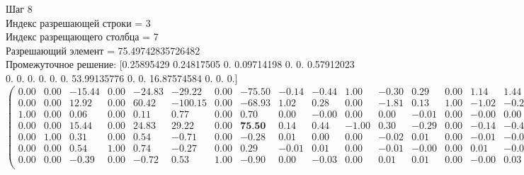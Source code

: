 \documentclass[draft]{article}
\begin{document}
\begin{flushleft}
    Шаг 8 \\
    Индекс разрешающей строки = 3\\
    Индекс разрещающего столбца = 7\\
    Разрешающий элемент = 75.49742835726482\\
    Промежуточное решение:
    [0.25895429  0.24817505  0.  0.09714198  0.  0.  0.57912023  0.  0.  0.  0.  0.  0.  53.99135776  0.  0.  16.87574584  0.  0.  0.]
\begin{equation*}
\begin{pmatrix}
    0.00 & 0.00 & -15.44 & 0.00 & -24.83 &  -29.22 & 0.00 & -75.50 & -0.14 & -0.44 &  1.00 & -0.30 &  0.29 & 0.00 &  1.14 &  1.44 & 0.00 &  1.30 &  0.71 &  1.00 & -16.88 \\
    0.00 & 0.00 &  12.92 & 0.00 &  60.42 & -100.15 & 0.00 & -68.93 &  1.02 &  0.28 &  0.00 & -1.81 &  0.13 & 1.00 & -1.02 & -0.28 & 0.00 &  1.81 & -0.13 & -1.00 &  53.99 \\
    1.00 & 0.00 &   0.06 & 0.00 &   0.11 &    0.77 & 0.00 &   0.70 &  0.00 & -0.00 &  0.00 &  0.00 & -0.01 & 0.00 & -0.00 &  0.00 & 0.00 & -0.00 &  0.01 &  0.00 &   0.26 \\
    0.00 & 0.00 &  15.44 & 0.00 &  24.83 &   29.22 & 0.00 &  \textbf{75.50} &  0.14 &  0.44 & -1.00 &  0.30 & -0.29 & 0.00 & -0.14 & -0.44 & 1.00 & -0.30 &  0.29 &  0.00 &  16.88 \\
    0.00 & 1.00 &   0.31 & 0.00 &   0.54 &   -0.71 & 0.00 &  -0.28 &  0.01 &  0.00 &  0.00 & -0.02 &  0.01 & 0.00 & -0.01 & -0.00 & 0.00 &  0.02 & -0.01 &  0.00 &   0.25 \\
    0.00 & 0.00 &   0.54 & 1.00 &   0.74 &   -0.27 & 0.00 &   0.29 & -0.01 &  0.01 &  0.00 & -0.01 & -0.00 & 0.00 &  0.01 & -0.01 & 0.00 &  0.01 &  0.00 &  0.00 &   0.10 \\
    0.00 & 0.00 &  -0.39 & 0.00 &  -0.72 &    0.53 & 1.00 &  -0.90 &  0.00 & -0.03 &  0.00 &  0.01 &  0.01 & 0.00 & -0.00 &  0.03 & 0.00 & -0.01 & -0.01 &  0.00 &   0.58 \\
\end{pmatrix}
\end{equation*}
\end{flushleft}
\end{document}
